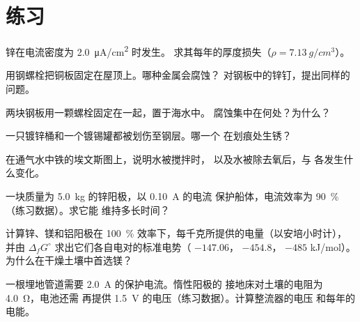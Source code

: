 \section{练习}

\begin{exercise}[$\star$]\label{exo:b2:corrosion:1}
锌在电流密度为 \qty{2.0}{\micro A/cm^2} 时发生。
求其每年的厚度损失（$\rho = \qty{7.13}{g/cm^3}$）。
\end{exercise}

\begin{exercise}[$\star$]\label{exo:b2:corrosion:2}
用钢螺栓把铜板固定在屋顶上。哪种金属会腐蚀？
对钢板中的锌钉，提出同样的问题。
\end{exercise}

\begin{exercise}[$\star$]\label{exo:b2:corrosion:3}
两块钢板用一颗螺栓固定在一起，置于海水中。
腐蚀集中在何处？为什么？
\end{exercise}

\begin{exercise}[$\star$]\label{exo:b2:corrosion:4}
一只镀锌桶和一个镀锡罐都被划伤至钢层。哪一个
在划痕处生锈？
\end{exercise}

\begin{exercise}[$\star\star$]\label{exo:b2:corrosion:5}
在通气水中铁的埃文斯图上，说明水被搅拌时，
以及水被除去氧后，与
各发生什么变化。
\end{exercise}

\begin{exercise}[$\star\star$]\label{exo:b2:corrosion:6}
一块质量为 \qty{5.0}{kg} 的锌阳极，以 \qty{0.10}{A} 的电流
保护船体，电流效率为 90~\%（练习数据）。求它能
维持多长时间？
\end{exercise}

\begin{exercise}[$\star\star$]\label{exo:b2:corrosion:7}
计算锌、镁和铝阳极在 100~\% 效率下，每千克所提供的电量（以安培小时计），
并由 $\Delta_f G^\circ$ 求出它们各自电对的标准电势（
 $-147.06$， $-454.8$，
 $-485$ \unit{kJ/mol}）。为什么在干燥土壤中首选镁？
\end{exercise}

\begin{exercise}[$\star\star$]\label{exo:b2:corrosion:8}
一根埋地管道需要 \qty{2.0}{A} 的保护电流。惰性阳极的
接地床对土壤的电阻为 \qty{4.0}{\ohm}，电池还需
再提供 \qty{1.5}{V} 的电压（练习数据）。计算整流器的电压
和每年的电能。
\end{exercise}

